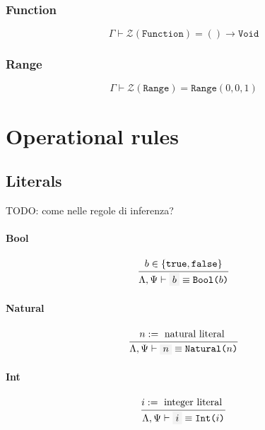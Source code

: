 \documentclass[11pt]{report}
\newcommand{\set}[1]{\left\{#1\right\}}
\newcommand{\infrule}[3][gathered]{\frac{\begin{#1}#2\end{#1}}{\begin{gathered}#3\end{gathered}}}
\newcommand{\oprule}[3][gathered]{\frac{\begin{#1}#2\end{#1}}{\begin{gathered}#3\end{gathered}}}
\newcommand{\then}{\vdash}
\newcommand{\code}[1]{\texttt{\colorbox{gray!10}{#1}}}
\newcommand{\Id}{\mathcal{I}}
\newcommand{\Zero}{\mathcal{Z}}
\newcommand{\Type}{\texttt{Type}}
\newcommand{\Void}{\texttt{Void}}
\newcommand{\Function}{\texttt{Function}}
\newcommand{\Range}{\texttt{Range}}
\newcommand{\Env}{\Gamma}
\newcommand{\EnvLoc}{\Lambda}
\newcommand{\EnvStore}{\Psi}
\theoremstyle{definition}
\newcommand{\comment}[1]{
	\parbox{0.9\linewidth}{\color{black!30}\small\sffamily #1}
}
\begin{document}
\subsubsection{Function}

\[
	\Env\then \Zero(\Function) = () \to \Void
\]


\subsubsection{Range}

\[
	\Env\then \Zero(\Range) = \Range(0, 0, 1)
\]

\newpage

\section{Operational rules}

\subsection{Literals}

\comment{TODO: come nelle regole di inferenza?}

\paragraph{Bool}

\[
	\oprule{
		b \in \set{\texttt{true}, \texttt{false}}
	}{
		\EnvLoc,\EnvStore\then \code{$b$} \equiv \texttt{Bool($b$)}
	}
\]

\paragraph{Natural}

\[
	\oprule{
		n := \text{ natural literal }
	}{
		\EnvLoc,\EnvStore\then \code{$n$} \equiv \texttt{Natural($n$)}
	}
\]

\paragraph{Int}

\[
	\oprule{
		i := \text{ integer literal }
	}{
		\EnvLoc,\EnvStore\then \code{$i$} \equiv \texttt{Int($i$)}
	}
\]
\end{document}
